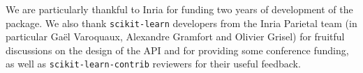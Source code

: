 \documentclass[twoside,11pt]{article}
\begin{document}
\acks

We are particularly thankful to Inria for funding two years of development of the package. We also thank \texttt{scikit-learn} developers from the Inria Parietal team (in particular Gaël Varoquaux, Alexandre Gramfort and Olivier Grisel) for fruitful discussions on the design of the API and for providing some conference funding, as well as \texttt{scikit-learn-contrib} reviewers for their useful feedback.





\end{document}
